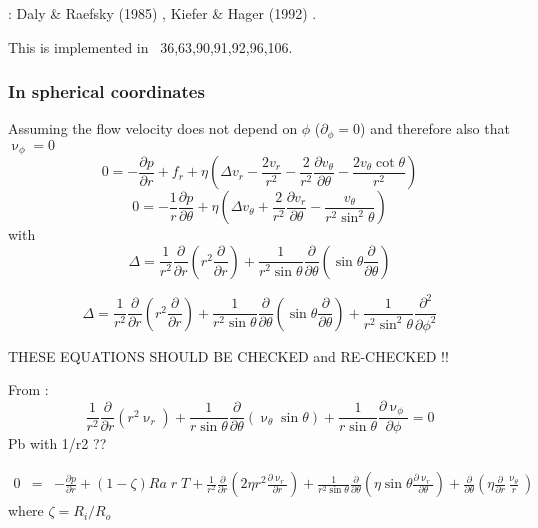 \Literature: Daly \& Raefsky (1985) \cite{dara85}, Kiefer \& Hager (1992) \cite{kiha92}.

This is implemented in \stone~36,63,90,91,92,96,106.

\subsubsection{In spherical coordinates}

Assuming the flow velocity does not depend on $\phi$ ($\partial_\phi =0$) and therefore also that $\upnu_\phi=0$
\[
0=-\frac{\partial p}{\partial r} + f_r + \eta \left(\Delta v_r - \frac{2v_r}{r^2} -\frac{2}{r^2} \frac{\partial v_\theta}{\partial \theta} - \frac{2 v_\theta \cot \theta }{r^2} \right)
\]
\[
0 = -\frac{1}{r} \frac{\partial p}{\partial \theta} + \eta \left(\Delta v_\theta + \frac{2}{r^2} \frac{\partial v_r}{\partial \theta}  - \frac{v_\theta}{r^2 \sin^2 \theta} \right)
\]
with
\[
\Delta = \frac{1}{r^2} \frac{\partial }{\partial r}\left( r^2 \frac{\partial }{\partial r}\right)
+\frac{1}{r^2 \sin\theta} \frac{\partial }{\partial \theta}
\left(
\sin\theta \frac{\partial }{\partial\theta}
\right)
\]


\[
\Delta = \frac{1}{r^2} \frac{\partial }{\partial r}\left( r^2 \frac{\partial }{\partial r}\right)
+\frac{1}{r^2 \sin\theta} \frac{\partial }{\partial \theta}
\left(
\sin\theta \frac{\partial }{\partial\theta}
\right)
+ \frac{1}{r^2 \sin^2\theta} \frac{\partial^2 }{\partial\phi^2}
\]

THESE EQUATIONS SHOULD BE CHECKED and RE-CHECKED !!



From \cite{zebi93}:
\begin{equation}
\frac{1}{r^2} \frac{\partial}{\partial r} (r^2 \upnu_r) + 
\frac{1}{r \sin \theta} \frac{\partial}{\partial \theta} (\upnu_\theta \sin \theta)+
\frac{1}{r \sin \theta} \frac{\partial \upnu_\phi}{\partial \phi} = 0
\end{equation}
Pb with 1/r2 ??

\begin{eqnarray}
0 &=& -\frac{\partial p}{\partial r} + (1-\zeta) Ra \; r \; T + 
\frac{1}{r^2}\frac{\partial}{\partial r} \left( 2 \eta r^2 \frac{\partial \upnu_r}{\partial r} \right)
+ \frac{1}{r^2 \sin\theta} \frac{\partial}{\partial\theta} 
\left( \eta \sin\theta \frac{\partial \upnu_r}{\partial\theta} \right)
+\frac{\partial}{\partial \theta} \left(\eta \frac{\partial}{\partial r} \frac{\upnu_\theta}{r} \right)
\end{eqnarray}
where $\zeta=R_i/R_o$



